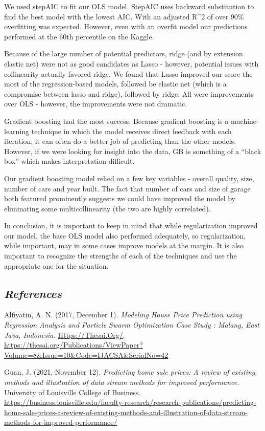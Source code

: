 \documentclass[
]{article}
\begin{document}
We used stepAIC to fit our OLS model. StepAIC uses backward substitution
to find the best model with the lowest AIC. With an adjusted R\^{}2 of
over 90\% overfitting was expected. However, even with an overfit model
our predictions performed at the 60th percentile on the Kaggle.

Because of the large number of potential predictors, ridge (and by
extension elastic net) were not as good candidates as Lasso - however,
potential issues with collinearity actually favored ridge. We found that
Lasso improved our score the most of the regression-based models,
followed be elastic net (which is a compromise between lasso and ridge),
followed by ridge. All were improvements over OLS - however, the
improvements were not dramatic.

Gradient boosting had the most success. Because gradient boosting is a
machine-learning technique in which the model receives direct feedback
with each iteration, it can often do a better job of predicting than the
other models. However, if we were looking for insight into the data, GB
is something of a ``black box'' which makes interpretation difficult.

Our gradient boosting model relied on a few key variables - overall
quality, size, number of cars and year built. The fact that number of
cars and size of garage both featured prominently suggests we could have
improved the model by eliminating some multicollinearity (the two are
highly correlated).

In conclusion, it is important to keep in mind that while regularization
improved our model, the base OLS model also performed adequately, so
regularization, while important, may in some cases improve models at the
margin. It is also important to recognize the strengths of each of the
techniques and use the appropriate one for the situation.

\hypertarget{references}{%
\subsection{\texorpdfstring{\emph{References}}{References}}\label{references}}

Alfiyatin, A. N. (2017, December 1). \emph{Modeling House Price
Prediction using Regression Analysis and Particle Swarm Optimization
Case Study : Malang, East Java, Indonesia.} \url{Https://Thesai.Org/}.
\url{https://thesai.org/Publications/ViewPaper?Volume=8\&Issue=10\&Code=IJACSA\&SerialNo=42}

Guan, J. (2021, November 12). \emph{Predicting home sale prices: A
review of existing methods and illustration of data stream methods for
improved performance.} University of Louisville College of Business.
\url{https://business.louisville.edu/faculty-research/research-publications/predicting-home-sale-prices-a-review-of-existing-methods-and-illustration-of-data-stream-methods-for-improved-performance/}
\end{document}
